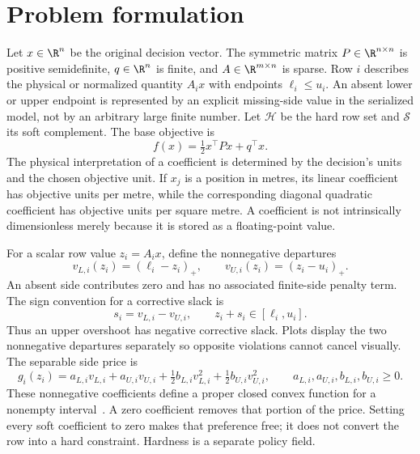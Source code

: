 \section{Problem formulation}\label{sec:formulation}
Let $x\in\R^n$ be the original decision vector. The symmetric matrix
$P\in\R^{n\times n}$ is positive semidefinite, $q\in\R^n$ is finite, and
$A\in\R^{m\times n}$ is sparse. Row $i$ describes the physical or normalized
quantity $A_i x$ with endpoints $\ell_i\leq u_i$. An absent lower or upper
endpoint is represented by an explicit missing-side value in the serialized
model, not by an arbitrary large finite number. Let $\mathcal H$ be the hard
row set and $\mathcal S$ its soft complement. The base objective is
\begin{equation}\label{eq:base-objective}
 f(x)=\tfrac12x^\top P x+q^\top x.
\end{equation}
The physical interpretation of a coefficient is determined by the decision's
units and the chosen objective unit. If $x_j$ is a position in metres, its linear
coefficient has objective units per metre, while the corresponding diagonal
quadratic coefficient has objective units per square metre. A coefficient is not
intrinsically dimensionless merely because it is stored as a floating-point value.

For a scalar row value $z_i=A_i x$, define the nonnegative departures
\begin{equation}\label{eq:departures}
 v_{L,i}(z_i)=(\ell_i-z_i)_+,\qquad
 v_{U,i}(z_i)=(z_i-u_i)_+.
\end{equation}
An absent side contributes zero and has no associated finite-side penalty term.
The sign convention for a corrective slack is
\begin{equation}\label{eq:corrective-slack}
 s_i=v_{L,i}-v_{U,i},\qquad z_i+s_i\in[\ell_i,u_i].
\end{equation}
Thus an upper overshoot has negative corrective slack. Plots display the two
nonnegative departures separately so opposite violations cannot cancel visually.
The separable side price is
\begin{equation}\label{eq:side-price}
 g_i(z_i)=a_{L,i}v_{L,i}+a_{U,i}v_{U,i}
       +\tfrac12b_{L,i}v_{L,i}^2+\tfrac12b_{U,i}v_{U,i}^2,
 \qquad a_{L,i},a_{U,i},b_{L,i},b_{U,i}\geq0.
\end{equation}
These nonnegative coefficients define a proper closed convex function for a
nonempty interval~\cite{boydconvex,rockafellar}. A zero coefficient removes that portion of the price. Setting
every soft coefficient to zero makes that preference free; it does not convert
the row into a hard constraint. Hardness is a separate policy field.

